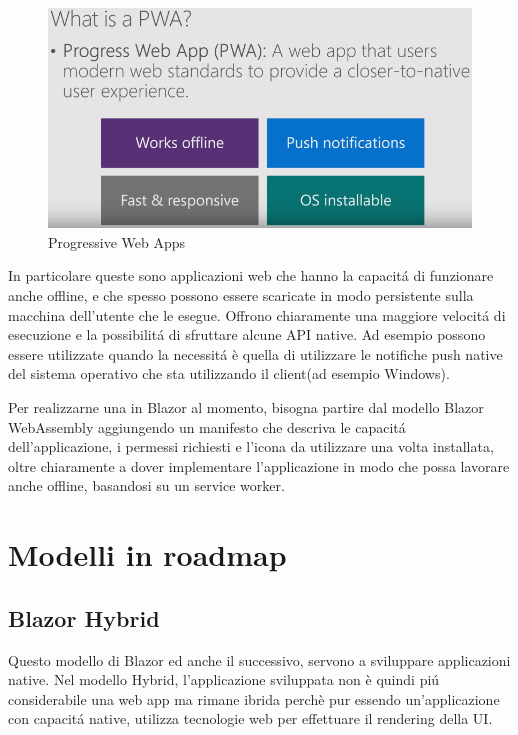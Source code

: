 \begin{figure}[H]
	\centerline{\includegraphics[scale=0.5]{figure/ProgressiveWebApp.png}}
	\caption{Progressive Web Apps}
	\label{fig:WhatIsAPWA}
\end{figure}

In particolare queste sono applicazioni web che hanno la capacit\'a di funzionare anche offline, e che spesso possono essere scaricate in modo persistente sulla macchina dell'utente che le esegue.
Offrono chiaramente una maggiore velocit\'a di esecuzione e la possibilit\'a di sfruttare alcune API native.
Ad esempio possono essere utilizzate quando la necessit\'a \`e quella di utilizzare le notifiche push native del sistema operativo che sta utilizzando il client(ad esempio Windows).

Per realizzarne una in Blazor al momento, bisogna partire dal modello Blazor WebAssembly aggiungendo un manifesto che descriva le capacit\'a dell'applicazione, i permessi richiesti e l'icona da utilizzare una volta installata, oltre chiaramente a dover implementare l'applicazione in modo che possa lavorare anche offline, basandosi su un service worker.\cite{blazorPWA}
\pagebreak

\section{Modelli in roadmap}
\subsection{Blazor Hybrid}\label{sez:bhybrid}
Questo modello di Blazor ed anche il successivo, servono a sviluppare applicazioni native.
Nel modello Hybrid, l'applicazione sviluppata non \`e quindi pi\'u considerabile una web app ma rimane ibrida perch\`e pur essendo un'applicazione con capacit\'a native, utilizza tecnologie web per effettuare il rendering della UI.

